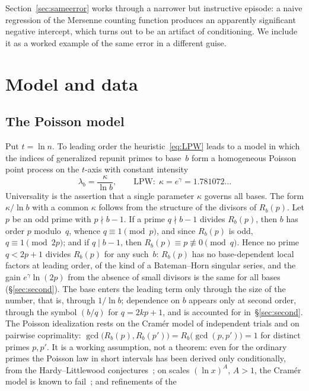 \documentclass[11pt,a4paper]{article}
\theoremstyle{plain}
\theoremstyle{remark}
\newcommand{\Rb}{R_b}
\newcommand{\eg}{e^{\gamma}}
\begin{document}
Section~\ref{sec:sameerror} works through a narrower but instructive episode: a
naive regression of the Mersenne counting function produces an apparently
significant negative intercept, which turns out to be an artifact of
conditioning. We include it as a worked example of the same error in a different
guise.

\section{Model and data}\label{sec:data}

\subsection{The Poisson model}
Put $t=\ln n$. To leading order the heuristic~\eqref{eq:LPW} leads to a model in
which the indices of generalized repunit primes to base~$b$ form a homogeneous
Poisson point process on the $t$-axis with constant intensity
\begin{equation}\label{eq:lam}
\lambda_b=\frac{\kappa}{\ln b},\qquad \text{LPW:}\ \ \kappa=\eg=1.781072\ldots
\end{equation}
Universality is the assertion that a single parameter $\kappa$ governs all
bases. The form $\kappa/\ln b$ with a common $\kappa$ follows from the structure
of the divisors of $\Rb(p)$. Let $p$ be an odd prime with $p\nmid b-1$. If a prime
$q\nmid b-1$ divides $\Rb(p)$, then $b$ has order $p$ modulo~$q$, whence
$q\equiv1\pmod p$, and since $\Rb(p)$ is odd, $q\equiv1\pmod{2p}$; and if
$q\mid b-1$, then $\Rb(p)\equiv p\not\equiv0\pmod q$. Hence no prime $q<2p+1$
divides $\Rb(p)$ for any such~$b$: $\Rb(p)$ has no base-dependent local factors at leading
order, of the kind of a Bateman--Horn singular series, and the gain
$\eg\ln(2p)$ from the absence of small divisors is the same for all bases
(\S\ref{sec:second}). The base enters the leading term only through the size of
the number, that is, through $1/\ln b$; dependence on $b$ appears only at second
order, through the symbol $(b/q)$ for $q=2kp+1$, and is accounted for
in~\S\ref{sec:second}. The Poisson idealization rests on the Cram\'er model of
independent trials and on pairwise coprimality:
$\gcd\bigl(\Rb(p),\Rb(p')\bigr)=\Rb\bigl(\gcd(p,p')\bigr)=1$ for distinct primes
$p,p'$. It is a working assumption, not a theorem: even for the ordinary primes
the Poisson law in short intervals has been derived only conditionally, from the
Hardy--Littlewood conjectures~\cite{gallagher1976}; on scales $(\ln x)^{A}$, $A>1$,
the Cram\'er model is known to fail~\cite{maier1985}; and refinements of the
\end{document}
